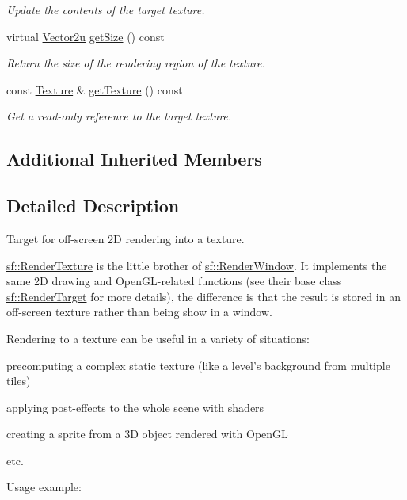 \begin{DoxyCompactItemize}
\begin{DoxyCompactList}\small\item\em Update the contents of the target texture. \end{DoxyCompactList}\item 
virtual \hyperlink{classsf_1_1Vector2}{Vector2u} \hyperlink{classsf_1_1RenderTexture_a757ba45ec7a7deefcaef717049b00b8c}{get\-Size} () const 
\begin{DoxyCompactList}\small\item\em Return the size of the rendering region of the texture. \end{DoxyCompactList}\item 
const \hyperlink{classsf_1_1Texture}{Texture} \& \hyperlink{classsf_1_1RenderTexture_a95bc5152c497066d31fdc57da8e17678}{get\-Texture} () const 
\begin{DoxyCompactList}\small\item\em Get a read-\/only reference to the target texture. \end{DoxyCompactList}\end{DoxyCompactItemize}
\subsection*{Additional Inherited Members}


\subsection{Detailed Description}
Target for off-\/screen 2\-D rendering into a texture. 

\hyperlink{classsf_1_1RenderTexture}{sf\-::\-Render\-Texture} is the little brother of \hyperlink{classsf_1_1RenderWindow}{sf\-::\-Render\-Window}. It implements the same 2\-D drawing and Open\-G\-L-\/related functions (see their base class \hyperlink{classsf_1_1RenderTarget}{sf\-::\-Render\-Target} for more details), the difference is that the result is stored in an off-\/screen texture rather than being show in a window.

Rendering to a texture can be useful in a variety of situations\-: \begin{DoxyItemize}
\item precomputing a complex static texture (like a level's background from multiple tiles) \item applying post-\/effects to the whole scene with shaders \item creating a sprite from a 3\-D object rendered with Open\-G\-L \item etc.\end{DoxyItemize}
Usage example\-:



